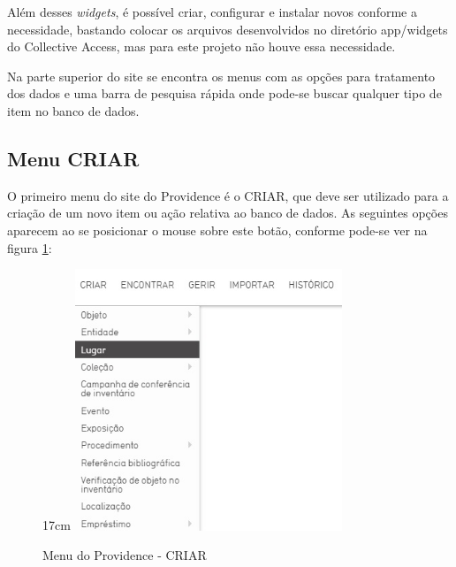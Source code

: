 \documentclass[a4paper,12pt,oneside,onecolumn,final,fleqn]{repUERJ}
\begin{document}
Além desses \textit{widgets}, é possível criar, configurar e instalar novos conforme a necessidade, bastando colocar os arquivos desenvolvidos no diretório app/widgets do Collective Access, mas para este projeto não houve essa necessidade.

Na parte superior do site se encontra os menus com as opções para tratamento dos dados e uma barra de pesquisa rápida onde pode-se buscar qualquer tipo de item no banco de dados.

\subsection{Menu CRIAR}

O primeiro menu do site do Providence é o CRIAR, que deve ser utilizado para a criação de um novo item ou ação relativa ao banco de dados. As seguintes opções aparecem ao se posicionar o mouse sobre este botão, conforme pode-se ver na figura \ref{fig:menu_criar}:

\begin{figure}[!ht]{17cm}
	\includegraphics[width=8cm, center]{figuras/menu_criar.jpg}
	\caption{Menu do Providence - CRIAR} \label{fig:menu_criar}
\end{figure}
\end{document}

